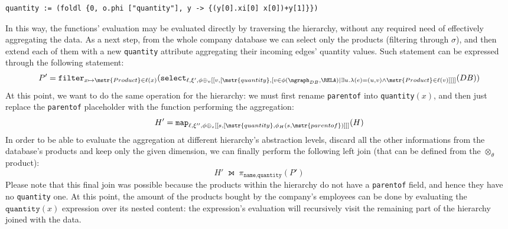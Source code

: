 \begin{example}[continues=ex:inaggr]
\begin{lstlisting}[language=script,basicstyle=\ttfamily\scriptsize]
	quantity := (foldl {0, o.phi ["quantity"], y -> {(y[0].xi[0] x[0])+y[1]}})
\end{lstlisting}
In this way, the functions' evaluation may be evaluated directly by traversing the hierarchy, without any required need of effectively aggregating the data.
	As a next step, from the whole company database we can select only the products (filtering through $\sigma$), and then extend each of them with a new \texttt{quantity} attribute aggregating their incoming edges' quantity values. Such statement can be expressed through the following statement:
	\[P'=\texttt{filter}_{x\mapsto \mstr{Product}\in\ell(x)}(\texttt{select}_{\ell,\xi',\phi \oplus_v[[v, [\mstr{quantity}, [v\in \phi(\ngraph_{DB},\RELA)|\exists u.\lambda(e)=(u,v)\wedge \mstr{Product}\in\ell(v)]]]]}(DB))\]
	At this point, we want to do the same operation for the hierarchy: we must first rename \texttt{parentof} into \texttt{quantity}$(x)$, and then just replace the \texttt{parentof} placeholder with the function performing the aggregation:
	\[H'=\texttt{map}_{\ell,\xi'',\phi\oplus_s [[s, [\mstr{quantity},\phi_H(s,\mstr{parentof})]]]}(H)\]
	In order to be able to evaluate the aggregation at different hierarchy's abstraction levels, discard all the other informations from the database's products and keep only the given dimension, we can finally perform the following left join (that can be defined from the $\otimes_\theta$ product):
	\[H'\;\leftouterjoin\; \pi_{\texttt{name,quantity}}(P')\]
	Please note that this final join was possible because the products within the hierarchy do not have a \texttt{parentof} field, and hence they have no \texttt{quantity} one. At this point, the amount of the products bought by the company's employees can be done by evaluating the $\texttt{quantity}(x)$ expression over its nested content: the expression's evaluation will recursively visit the remaining part of the hierarchy joined with the data.
\end{example}

